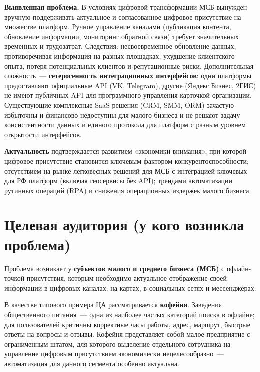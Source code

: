 \documentclass[12pt]{G7-32}
\begin{document}
\textbf{Выявленная проблема.} В условиях цифровой трансформации МСБ вынужден вручную поддерживать актуальное и согласованное цифровое присутствие на множестве платформ. Ручное управление каналами (публикация контента, обновление информации, мониторинг обратной связи) требует значительных временных и трудозатрат. Следствия: несвоевременное обновление данных, противоречивая информация на разных площадках, ухудшение клиентского опыта, потеря потенциальных клиентов и репутационные риски. Дополнительная сложность~--- \textbf{гетерогенность интеграционных интерфейсов}: одни платформы предоставляют официальные API (VK, Telegram), другие (Яндекс.Бизнес, 2ГИС) не имеют публичных API для программного управления карточкой организации. Существующие комплексные SaaS-решения (CRM, SMM, ORM) зачастую избыточны и финансово недоступны для малого бизнеса и не решают задачу консистентности данных и единого протокола для платформ с разным уровнем открытости интерфейсов.

\textbf{Актуальность} подтверждается развитием «экономики внимания», при которой цифровое присутствие становится ключевым фактором конкурентоспособности; отсутствием на рынке легковесных решений для МСБ с интеграцией ключевых для РФ платформ (включая геосервисы без API); трендами автоматизации рутинных операций (RPA) и снижения операционных издержек малого бизнеса.

\chapter{Целевая аудитория (у кого возникла проблема)}
\label{ch:audience}

Проблема возникает у \textbf{субъектов малого и среднего бизнеса (МСБ)} с офлайн-точкой присутствия, которым необходимо актуальное отображение своей информации в цифровых каналах: на картах, в социальных сетях и мессенджерах.

В качестве типового примера ЦА рассматривается \textbf{кофейня}. Заведения общественного питания~--- одна из наиболее частых категорий поиска в офлайне; для пользователей критичны корректные часы работы, адрес, маршрут, быстрые ответы на вопросы и отзывы. Кофейня представляет собой малое предприятие с ограниченным штатом, для которого выделение отдельного сотрудника на управление цифровым присутствием экономически нецелесообразно~--- автоматизация для данного сегмента особенно актуальна.
\end{document}
